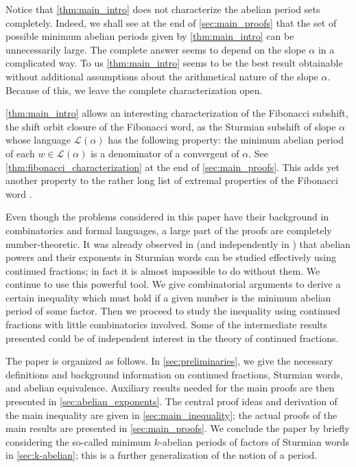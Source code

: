 \documentclass[a4paper,fleqn]{article}
\newcommand{\Lang}[2][]{\mathcal{L}_{#1}(#2)}
\begin{document}
  Notice that \autoref{thm:main_intro} does not characterize the abelian period sets completely. Indeed, we shall see
  at the end of \autoref{sec:main_proofs} that the set of possible minimum abelian periods given by
  \autoref{thm:main_intro} can be unnecessarily large. The complete answer seems to depend on the slope $\alpha$ in a
  complicated way. To us \autoref{thm:main_intro} seems to be the best result obtainable without additional assumptions
  about the arithmetical nature of the slope $\alpha$. Because of this, we leave the complete characterization open.

  \autoref{thm:main_intro} allows an interesting characterization of the Fibonacci subshift, the shift orbit closure of
  the Fibonacci word, as the Sturmian subshift of slope $\alpha$ whose language $\Lang{\alpha}$ has the following
  property: the minimum abelian period of each $w \in \Lang{\alpha}$ is a denominator of a convergent of $\alpha$. See
  \autoref{thm:fibonacci_characterization} at the end of \autoref{sec:main_proofs}. This adds yet another property to
  the rather long list of extremal properties of the Fibonacci word
  \cite{2008:on_extremal_properties_of_the_fibonacci_word,2013:some_extremal_properties_of_the_fibonacci_word,2014:lyndon_words_and_fibonacci_numbers}.

  Even though the problems considered in this paper have their background in combinatorics and formal languages, a
  large part of the proofs are completely number-theoretic. It was already observed in
  \cite{2016:abelian_powers_and_repetitions_in_sturmian_words} (and independently in
  \cite{2013:some_properties_of_abelian_return_words}) that abelian powers and their exponents in Sturmian words can be
  studied effectively using continued fractions; in fact it is almost impossible to do without them. We continue to use
  this powerful tool. We give combinatorial arguments to derive a certain inequality which must hold if a given number
  is the minimum abelian period of some factor. Then we proceed to study the inequality using continued fractions with
  little combinatorics involved. Some of the intermediate results presented could be of independent interest in the
  theory of continued fractions.

  The paper is organized as follows. In \autoref{sec:preliminaries}, we give the necessary definitions and background
  information on continued fractions, Sturmian words, and abelian equivalence. Auxiliary results needed for the main
  proofs are then presented in \autoref{sec:abelian_exponents}. The central proof ideas and derivation of the main
  inequality are given in \autoref{sec:main_inequality}; the actual proofs of the main results are presented in
  \autoref{sec:main_proofs}. We conclude the paper by briefly considering the so-called minimum $k$-abelian periods of
  factors of Sturmian words in \autoref{sec:k-abelian}; this is a further generalization of the notion of a period.
  
\end{document}
